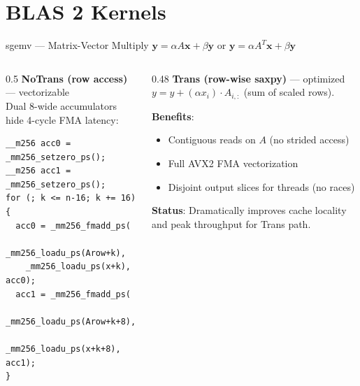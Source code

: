\documentclass[aspectratio=169,10pt]{beamer}
\begin{document}
\section{BLAS 2 Kernels}

\begin{frame}[fragile]{sgemv --- Matrix-Vector Multiply}
  $\mathbf{y} = \alpha A \mathbf{x} + \beta \mathbf{y}$ \quad or \quad
  $\mathbf{y} = \alpha A^T \mathbf{x} + \beta \mathbf{y}$

  \begin{columns}[T]
    \begin{column}{0.5\textwidth}
      \textbf{NoTrans (row access)} --- vectorizable\\[0.3em]
      Dual 8-wide accumulators hide 4-cycle FMA latency:
      \begin{lstlisting}
__m256 acc0 = _mm256_setzero_ps();
__m256 acc1 = _mm256_setzero_ps();
for (; k <= n-16; k += 16) {
  acc0 = _mm256_fmadd_ps(
    _mm256_loadu_ps(Arow+k),
    _mm256_loadu_ps(x+k), acc0);
  acc1 = _mm256_fmadd_ps(
    _mm256_loadu_ps(Arow+k+8),
    _mm256_loadu_ps(x+k+8), acc1);
}
      \end{lstlisting}
    \end{column}
    \begin{column}{0.48\textwidth}
      \textbf{Trans (row-wise saxpy)} --- optimized\\[0.3em]
      $y = y + (\alpha x_i) \cdot A_{i,:}$ (sum of scaled rows).

      \medskip
      \textbf{Benefits}:
      \begin{itemize}
        \item Contiguous reads on $A$ (no strided access)
        \item Full AVX2 FMA vectorization
        \item Disjoint output slices for threads (no races)
      \end{itemize}

      \medskip
      \textbf{Status}: Dramatically improves cache locality and peak throughput for Trans path.
    \end{column}
  \end{columns}
\end{frame}
\end{document}
